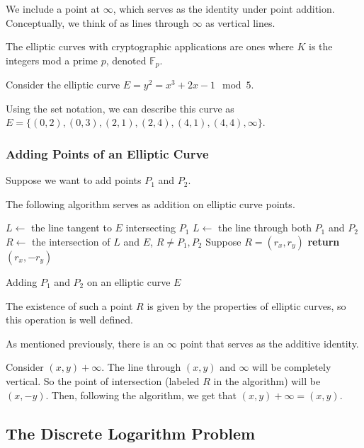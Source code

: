 We include a point at
$\infty$, which serves as the identity under point addition.
Conceptually, we think of as lines through $\infty$
as vertical lines.

The elliptic curves with cryptographic applications are ones where $K$ is the integers
mod a prime $p$, denoted $\mathbb{F}_p$.

\begin{example}
Consider the elliptic curve $E = y^2 = x^3+2x-1 \mod 5$.

Using the set notation, we can describe this curve as
$E = \{(0 ,2 ),(0,3),(2,1),(2 ,4 ),(4,1),(4,4), \infty\}$.
\end{example}




\subsubsection{Adding Points of an Elliptic Curve}
Suppose we want to add points $P_1$ and $P_2$.

The following algorithm serves as addition on elliptic curve points.
\begin{algorithm}
    \begin{algorithmic}
         \State $L \gets$ the line tangent to $E$ intersecting $P_1$
         \Else
         \State $L \gets$ the line through both $P_1$ and $P_2$
         \EndIf
         \State $R \gets$ the intersection of $L$ and $E$, $R \neq P_1, P_2$
         \State Suppose $R = (r_x, r_y)$
         \State \textbf{return} $(r_x, -r_y)$
         \EndProcedure
     \end{algorithmic}
     \caption{Adding $P_1$ and $P_2$ on an elliptic curve $E$}
     \label{euclid}
 \end{algorithm}

The existence of such a point $R$ is given by the properties of elliptic curves,
so this operation is well defined.

As mentioned previously, there is an $\infty$ point that serves as the additive identity.

Consider $(x,y) + \infty$.
The line through $(x,y)$ and $\infty$ will be completely vertical.
So the point of intersection (labeled $R$ in the algorithm) will be $(x,-y)$.
Then, following the algorithm, we get that $(x,y) + \infty = (x,y)$.




\subsection{The Discrete Logarithm Problem}

